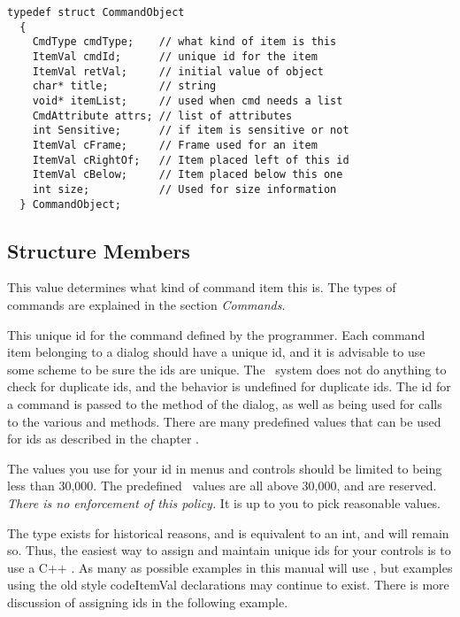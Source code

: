 \footnotesize
\begin{verbatim}
typedef struct CommandObject
  {
    CmdType cmdType;    // what kind of item is this
    ItemVal cmdId;      // unique id for the item
    ItemVal retVal;     // initial value of object
    char* title;        // string
    void* itemList;     // used when cmd needs a list
    CmdAttribute attrs; // list of attributes
    int Sensitive;      // if item is sensitive or not
    ItemVal cFrame;     // Frame used for an item
    ItemVal cRightOf;   // Item placed left of this id
    ItemVal cBelow;     // Item placed below this one
    int size;           // Used for size information
  } CommandObject;
\end{verbatim}
\normalfont\normalsize

\subsection* {Structure Members}

 This value determines what kind of command
item this is. The types of commands are explained in the
section \emph{Commands}.

 This unique id for the command defined by
the programmer. Each command item belonging to a dialog should
have a unique id, and it is advisable to use some scheme to be
sure the ids are unique. The \V\ system does not do anything to
check for duplicate ids, and the behavior is undefined for
duplicate ids. The id for a command is passed to the
 method of the dialog, as well as being used
for calls to the various  and  methods.
There are many predefined values that can be used for ids as
described in the chapter .

The values you use for your id in menus and controls should
be limited to being less than 30,000. The predefined
\V\ values are all above 30,000, and are reserved. \emph{
There is no enforcement of this policy.} It is up to you
to pick reasonable values.

The type  exists for historical reasons, and
is equivalent to an int, and will remain so. Thus, the easiest
way to assign and maintain unique ids for your controls
is to use a C++ . As many as possible examples
in this manual will use , but examples using the old style
 code{ItemVal} declarations may
continue to exist. There is more discussion of assigning ids
in the following example.

